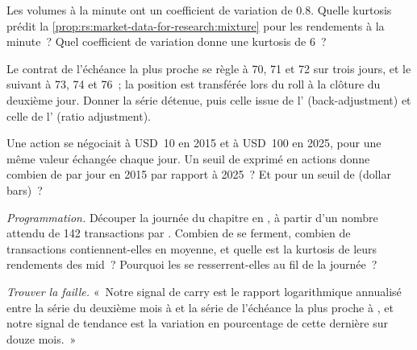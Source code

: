 \begin{exercise}[$\star\star$]\label{exo:rs:market-data-for-research:4}
Les volumes à la minute ont un coefficient de variation de 0.8. Quelle kurtosis prédit la \cref{prop:rs:market-data-for-research:mixture}
pour les rendements à la minute~? Quel coefficient de variation donne une kurtosis de 6~?
\end{exercise}

\begin{exercise}[$\star\star$]\label{exo:rs:market-data-for-research:5}
Le contrat de l'échéance la plus proche se règle à 70, 71 et 72 sur trois jours, et le suivant à 73, 74 et 76~; la position est transférée lors du roll à la clôture du
deuxième jour. Donner la série détenue, puis celle issue de l' (back-adjustment) et celle de l' (ratio adjustment).
\end{exercise}

\begin{exercise}[$\star\star$]\label{exo:rs:market-data-for-research:6}
Une action se négociait à USD~10 en 2015 et à USD~100 en 2025, pour une même valeur échangée chaque jour. Un seuil de  exprimé en
actions donne combien de  par jour en 2015 par rapport à 2025~? Et pour un seuil de  (dollar bars)~?
\end{exercise}

\begin{exercise}[$\star\star\star$]\label{exo:rs:market-data-for-research:7}
\emph{Programmation.} Découper la journée du chapitre en , à partir d'un nombre attendu de 142 transactions par . Combien de  se ferment, combien
de transactions contiennent-elles en moyenne, et quelle est la kurtosis de leurs rendements des mid~? Pourquoi les  se resserrent-elles au fil de la journée~?
\end{exercise}

\begin{exercise}[$\star\star\star$]\label{exo:rs:market-data-for-research:8}
\emph{Trouver la faille.} «~Notre signal de carry est le rapport logarithmique annualisé entre la série du deuxième mois à  et
la série de l'échéance la plus proche à , et notre signal de tendance est la variation en pourcentage de cette dernière sur
douze mois.~»
\end{exercise}

